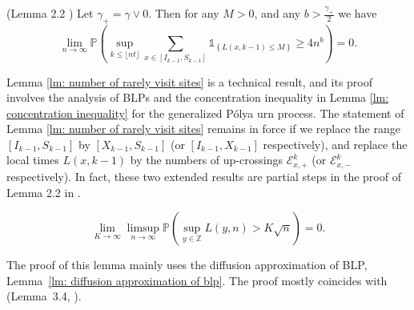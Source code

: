 \documentclass[EJP]{ejpecp} %
\begin{document}
\begin{lemma}(Lemma 2.2 \cite{KMP23})\label{lm: number of rarely visit sites}
	Let $\gamma_+ = \gamma \vee 0$. Then for any $M>0$, and any $b>\frac{\gamma_+}{2}$ we have
	\[
	\lim_{n\to\infty} \mathbb{P}\left(\sup_{k\leq\lfloor nt \rfloor}  \sum_{x\in [I_{k-1}, S_{k-1}]} \mathbb{1}_{\left\{ L(x,k-1) \leq M \right\}} \geq 4n^b \right) = 0.
	\]
	
\end{lemma}	
Lemma \ref{lm: number of rarely visit sites} is a technical result, and its proof involves the analysis of BLPs and the concentration inequality in Lemma \ref{lm: concentration inequality} for the generalized P\'{o}lya urn process. The statement of Lemma \ref{lm: number of rarely visit sites} remains in force if we replace the range $[I_{k-1}, S_{k-1}]$ by $[X_{k - 1},S_{k - 1}]$ (or $[I_{k-1},X_{k - 1}]$ respectively), and replace the local times $L(x,k-1)$ by the numbers of up-crossings $\mathcal{E}^{k}_{x,+}$ (or $\mathcal{E}^{k}_{x,-}$ respectively). In fact, these two extended results are partial steps in the proof of Lemma 2.2 in \cite{KMP23}.   

\begin{lemma}
	\label{lm: uniform control of local time}
	\[
	\lim_{K \to  \infty } \limsup_{n \to \infty } \mathbb{P}\left( \sup_{y \in \mathbb{Z}} L\left( y, n \right) > K \sqrt{n}  \right) = 0
	.\] 
\end{lemma}
The proof of this lemma mainly uses the diffusion approximation of BLP, Lemma~\ref{lm: diffusion approximation of blp}. The proof mostly coincides with (Lemma~3.4, \cite{KP16}). 
\end{document}
